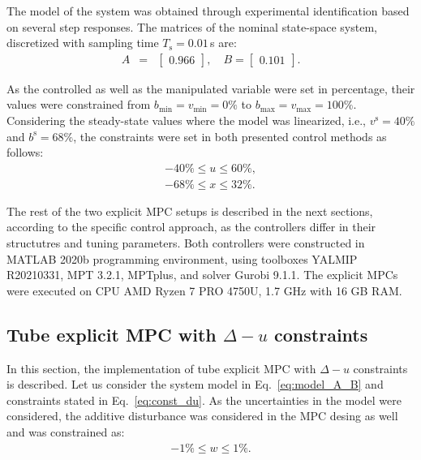 \documentclass[letterpaper, 10 pt, conference]{ieeeconf}
\begin{document}
The model of the system was obtained through experimental identification based on several step responses. The matrices of the nominal state-space system, discretized with sampling time $T_\mathrm{s} = 0.01$\,s are:
\begin{subequations}
	\label{eq:model_A_B} 
	\begin{eqnarray}
		A &=& \begin{bmatrix}
			0.966
		\end{bmatrix}, \quad %
		B = \begin{bmatrix}
			0.101
		\end{bmatrix}. 
	\end{eqnarray}
\end{subequations}

As the controlled as well as the manipulated variable were set in percentage, their values were constrained from $b_{\min} = v_{\min} = 0\%$ to $b_{\max} = v_{\max} = 100\%$. Considering the steady-state values where the model was linearized, i.e., $ v^\mathrm{s} = 40\%$ and $ b^\mathrm{s} = 68\%$, the constraints were set in both presented control methods as follows: 
\begin{subequations}
	\label{eq:const_u_y} 
	\begin{eqnarray}
	\label{eq:const_u}
	-40\% \le u \le 60\%, \\
	\label{eq:const_y}
	-68\% \le x \le 32\%.
	\end{eqnarray}
\end{subequations}

The rest of the two explicit MPC setups is described in the next sections, according to the specific control approach, as the controllers differ in their structutres and tuning parameters. Both controllers were constructed in MATLAB 2020b programming environment, using toolboxes YALMIP R20210331, MPT 3.2.1, MPTplus,
and solver Gurobi 9.1.1. The explicit MPCs were executed on
CPU AMD Ryzen 7 PRO 4750U, 1.7 GHz with 16 GB RAM.

\subsection{Tube explicit MPC with $\Delta-u$ constraints}
\label{sec:tube_exp}
In this section, the implementation of tube explicit MPC with $\Delta-u$ constraints is described. Let us consider the system model in Eq.~\eqref{eq:model_A_B} and constraints stated in Eq.~\eqref{eq:const_du}. 
As the uncertainties in the model were considered, the additive disturbance was considered in the MPC desing as well and was constrained as:
\begin{eqnarray}
	\label{eq:const_w}
	-1\% \le w \le 1\%.
\end{eqnarray}
\end{document}
